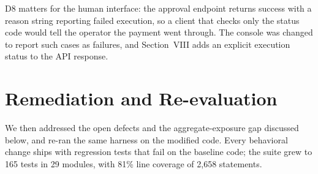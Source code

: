 \documentclass[conference]{IEEEtran}
\begin{document}
D8 matters for the human interface: the approval endpoint returns success with a reason string reporting failed execution, so a client that checks only the status code would tell the operator the payment went through. The console was changed to report such cases as failures, and Section~VIII adds an explicit execution status to the API response.

\section{Remediation and Re-evaluation}
We then addressed the open defects and the aggregate-exposure gap discussed below, and re-ran the same harness on the modified code. Every behavioral change ships with regression tests that fail on the baseline code; the suite grew to 165 tests in 29 modules, with 81\% line coverage of 2{,}658 statements.
\end{document}
